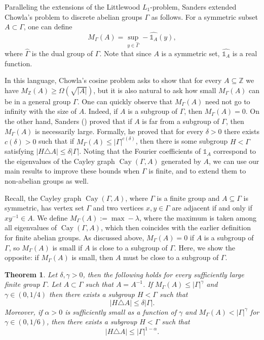 \documentclass[11pt]{article}
\theoremstyle{plain}
\newtheorem{theorem}{Theorem}[section]
\theoremstyle{definition}
\newcommand{\bZ}{\mathbb{Z}}
\DeclareMathOperator{\Cay}{Cay}
\newcommand{\am}[1]{\textcolor{violet}{am: #1}}
\begin{document}
Paralleling the extensions of the Littlewood $L_1$-problem, Sanders \cite{Sanders} extended Chowla's problem to discrete abelian groups $\Gamma$ as follows. For a symmetric subset $A\subset \Gamma$, one can define 
$$M_{\Gamma}(A)=\sup_{y\in \widehat{\Gamma}} -\widehat{\mathds{1}_A}(y),$$
where $\widehat{\Gamma}$ is the dual group of $\Gamma$.
Note that since $A$ is a symmetric set, $\widehat{\mathds{1}_A}$ is a real function. 

In this language, Chowla's cosine problem asks to show that for every $A\subseteq \bZ$ we have $M_{\bZ}(A)\geq \Omega(\sqrt{|A|})$, but it is also natural to ask how small $M_{\Gamma}(A)$ can be in a general group $\Gamma$.
One can quickly observe that $M_{\Gamma}(A)$ need not go to infinity with the size of $A$. 
Indeed, if $A$ is a subgroup of $\Gamma$, then $M_{\Gamma}(A)=0$. 
On the other hand, Sanders (\cite[Theorem 1.3]{Sanders}) proved that if $A$ is far from a subgroup of $\Gamma$, then $M_{\Gamma}(A)$ is necessarily large. 
Formally, he proved that for every $\delta>0$ there exists $c(\delta)>0$ such that if $M_\Gamma(A)\leq |\Gamma|^{c(\delta)}$, then there is some subgroup $H<\Gamma$ satisfying  $|H\triangle A|\leq \delta |\Gamma|$. 
Noting that the Fourier coefficients of $\mathds{1}_A$ correspond to the eigenvalues of the Cayley graph $\Cay(\Gamma,A)$ generated by $A$, we can use our main results to improve these bounds when $\Gamma$ is finite, and to extend them to non-abelian groups as well.

Recall, the Cayley graph $\Cay(\Gamma,A)$, where $\Gamma$ is a finite group and $A\subseteq \Gamma$ is symmetric, has vertex set $\Gamma$ and two vertices $x,y\in \Gamma$ are adjacent if and only if $xy^{-1} \in A$.
We define $M_\Gamma(A) := \max-\lambda$, where the maximum is taken among all eigenvalues of $\Cay(\Gamma,A)$, which then coincides with the earlier definition for finite abelian groups. 
As discussed above, $M_\Gamma(A)=0$ if $A$ is a subgroup of $\Gamma$, so $M_\Gamma(A)$ is small if $A$ is close to a subgroup of $\Gamma$.
Here, we show the opposite: if $M_\Gamma(A)$ is small, then $A$ must be close to a subgroup of $\Gamma$.

\begin{theorem}\label{thm:chowla_group}
Let $\delta,\gamma>0$, then the following holds for every sufficiently large finite group  $\Gamma$. 
Let $A\subset \Gamma$ such that $A=A^{-1}$. 
If $M_\Gamma(A)\leq |\Gamma|^{\gamma}$ and $\gamma\in (0, 1/4)$ then there exists a subgroup $H<\Gamma$ such that $$|H\triangle A|\leq \delta |\Gamma|.$$
Moreover, if $\alpha>0$ is sufficiently small as a function of $\gamma$ and $M_{\Gamma}(A)< |\Gamma|^{\gamma}$ for $\gamma\in (0, 1/6)$, then there exists a subgroup $H<\Gamma$ such that
$$|H\triangle A|\leq |\Gamma|^{1-\alpha}.$$
\end{theorem}
\end{document}
